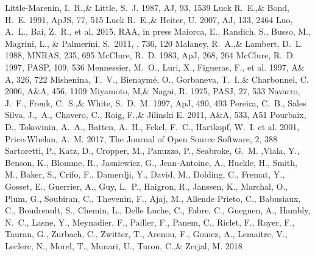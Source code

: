 \documentclass[a4paper,fleqn,usenatbib]{mnras}
\begin{document}
\begin{thebibliography}{99}
Little-Marenin, I.~R.,\& Little, S.~J. 1987, 
AJ, 93, 1539
Luck R.~E.,\& Bond, H.~E. 1991, 
ApJS, 77, 515
Luck R.~E.,\& Heiter, U. 2007, 
AJ, 133, 2464
Luo, A.~L., Bai, Z.~R., et al. 2015, 
RAA, in press
 Maiorca, E., Randich, S., Busso, M., Magrini, L., \& Palmerini, S.\ 2011, \apj, 736, 120 
Malaney, R.~A.,\& Lambert, D.~L. 1988, 
MNRAS, 235, 695
McClure, R.~D. 1983, 
ApJ, 268, 264
McClure, R.~D. 1997, 
PASP, 109, 536
Mennessier, M.~O., Luri, X., Figueras, F., et al. 1997, 
A$\&$A, 326, 722
Mishenina, T.~V., Bienaym\' e, O., Gorbaneva, T.~I.,\& Charbonnel, C. 2006, 
A$\&$A, 456, 1109
Miyamoto, M,\& Nagai, R. 1975, 
PASJ, 27, 533
Navarro, J.~F., Frenk, C.~S.,\& White, S.~D.~M. 1997, 
ApJ, 490, 493
Pereira, C.~B., Sales Silva, J.,~A., Chavero, C., Roig, F.,\& Jilinski E. 2011, 
A$\&$A, 533, A51
Pourbaix, D., Tokovinin, A.~A., Batten, A.~H., Fekel, F.~C., Hartkopf, W.~I. et al. 2001, 
Price-Whelan, A.~M. 2017, 
The Journal of Open Source Software, 2, 388
Sartoretti, P., Katz, D., Cropper, M., Panuzzo, P., Seabroke, G.~M. ,Viala, Y., Benson, K., Blomme, R., Jasniewicz, G., Jean-Antoine, A., Huckle, H., Smith, M., Baker, S., Crifo, F., Damerdji, Y., David, M., Dolding, C., Fremat, Y., Gosset, E., Guerrier, A., Guy, L.~P., Haigron, R., Janssen, K., Marchal, O., Plum, G., Soubiran, C., Thevenin, F., Ajaj, M., Allende Prieto, C., Babusiaux, C., Boudreault, S., Chemin, L., Delle Luche, C., Fabre, C., Gueguen, A., Hambly, N.~C., Lasne, Y., Meynadier, F., Pailler, F., Panem, C., Riclet, F., Royer, F., Tauran, G., Zurbach, C., Zwitter, T., Arenou, F., Gomez, A., Lemaitre, V., Leclerc, N., Morel, T., Munari, U., Turon, C.,\& Zerjal, M. 2018

\end{thebibliography}
\end{document}
